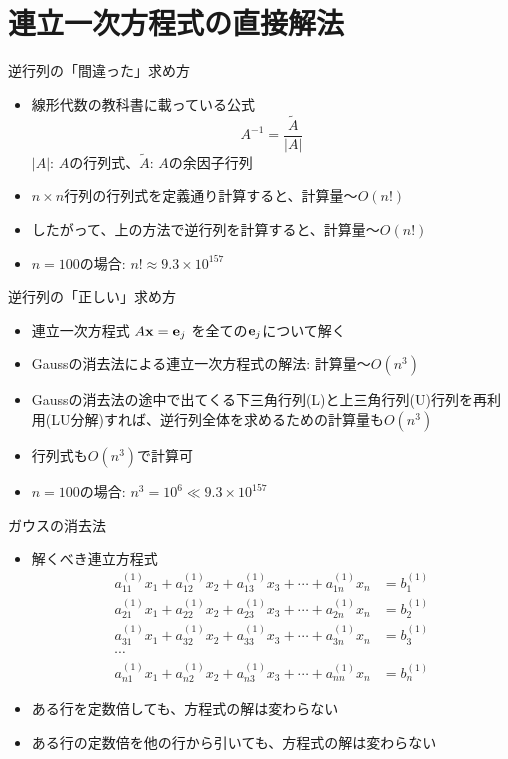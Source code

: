 \section{連立一次方程式の直接解法}

\begin{frame}[t,fragile]{逆行列の「間違った」求め方}
  \begin{itemize}
    \setlength{\itemsep}{1em}
  \item 線形代数の教科書に載っている公式
    \[
    A^{-1} = \frac{\tilde{A}}{|A|}
    \]
    $|A|$: $A$の行列式、$\tilde{A}$: $A$の余因子行列
  \item $n \times n$行列の行列式を定義通り計算すると、計算量〜$O(n!)$
  \item したがって、上の方法で逆行列を計算すると、計算量〜$O(n!)$
  \item $n=100$の場合: $n! \approx 9.3 \times 10^{157}$
  \end{itemize}
\end{frame}

\begin{frame}[t,fragile]{逆行列の「正しい」求め方}
  \begin{itemize}
    \setlength{\itemsep}{1em}
  \item 連立一次方程式 $A {\bf x} = {\bf e}_j$ を全ての${\bf e}_j$について解く
  \item Gaussの消去法による連立一次方程式の解法: 計算量〜$O(n^3)$
  \item Gaussの消去法の途中で出てくる下三角行列(L)と上三角行列(U)行列を再利用(LU分解)すれば、逆行列全体を求めるための計算量も$O(n^3)$
  \item 行列式も$O(n^3)$で計算可
  \item $n=100$の場合: $n^3 = 10^6 \ll 9.3 \times 10^{157}$
  \end{itemize}
\end{frame}

\begin{frame}[t,fragile]{ガウスの消去法}
  \begin{itemize}
    \setlength{\itemsep}{1em}
  \item 解くべき連立方程式
    \begin{align*}
    a_{11}^{(1)} x_1 + a_{12}^{(1)} x_2 + a_{13}^{(1)} x_3 + \cdots + a_{1n}^{(1)} x_n &= b_{1}^{(1)} \\
    a_{21}^{(1)} x_1 + a_{22}^{(1)} x_2 + a_{23}^{(1)} x_3 + \cdots + a_{2n}^{(1)} x_n &= b_{2}^{(1)} \\
    a_{31}^{(1)} x_1 + a_{32}^{(1)} x_2 + a_{33}^{(1)} x_3 + \cdots + a_{3n}^{(1)} x_n &= b_{3}^{(1)} \\
    \cdots \\
    a_{n1}^{(1)} x_1 + a_{n2}^{(1)} x_2 + a_{n3}^{(1)} x_3 + \cdots + a_{nn}^{(1)} x_n &= b_{n}^{(1)}
    \end{align*}
  \item ある行を定数倍しても、方程式の解は変わらない
  \item ある行の定数倍を他の行から引いても、方程式の解は変わらない
  \end{itemize}
\end{frame}

